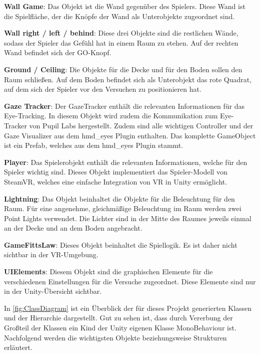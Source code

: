 \begin{description}
	\item \textbf{Wall Game}: Das Objekt ist die Wand gegenüber des Spielers. Diese Wand ist die Spielfläche, der die Knöpfe der Wand als Unterobjekte zugeordnet sind.
	\item \textbf{Wall right / left / behind}: Diese drei Objekte sind die restlichen Wände, sodass der Spieler das Gefühl hat in einem Raum zu stehen. Auf der rechten Wand befindet sich der GO-Knopf.
	\item \textbf{Ground / Ceiling}: Die Objekte für die Decke und für den Boden sollen den Raum schließen. Auf dem Boden befindet sich als Unterobjekt das rote Quadrat, auf dem sich der Spieler vor den Versuchen zu positionieren hat.
	\item \textbf{Gaze Tracker}: Der GazeTracker enthält die relevanten Informationen für das Eye-Tracking. In diesem Objekt wird zudem die Kommunikation zum Eye-Tracker von Pupil Labs hergestellt. Zudem sind alle wichtigen Controller und der Gaze Visualizer aus dem hmd\_eyes Plugin enthalten. Das komplette GameObject ist ein Prefab, welches aus dem hmd\_eyes Plugin stammt. 
	\item \textbf{Player}: Das Spielerobjekt enthält die relevanten Informationen, welche für den Spieler wichtig sind. Dieses Objekt implementiert das Spieler-Modell von SteamVR, welches eine einfache Integration von \ac{VR} in Unity ermöglicht.
	\item \textbf{Lightning}: Das Objekt beinhaltet die Objekte für die Beleuchtung für den Raum. Für eine angenehme, gleichmäßige Beleuchtung im Raum werden zwei Point Lights verwendet. Die Lichter sind in der Mitte des Raumes jeweils einmal an der Decke und an dem Boden angebracht. 
	\item \textbf{GameFittsLaw}: Dieses Objekt beinhaltet die Spiellogik. Es ist daher nicht sichtbar in der \ac{VR}-Umgebung. 
	\item \textbf{UIElements}: Diesem Objekt sind die graphischen Elemente für die verschiedenen Einstellungen für die Versuche zugeordnet. Diese Elemente sind nur in der Unity-Übersicht sichtbar. 
\end{description}

In \autoref{fig:ClassDiagram} ist ein Überblick der für dieses Projekt generierten Klassen und der Hierarchie dargestellt. Gut zu sehen ist, dass durch Vererbung der Großteil der Klassen ein Kind der Unity eigenen Klasse {\ttfamily MonoBehaviour} ist. Nachfolgend werden die wichtigsten Objekte beziehungsweise Strukturen erläutert. 

